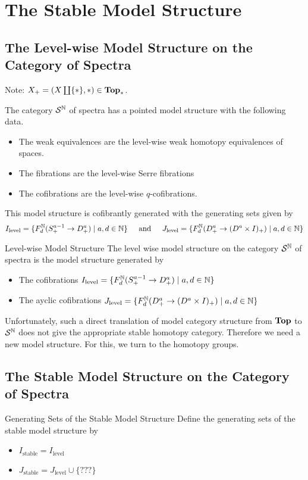 \documentclass[a4paper]{article}
\begin{document}
\pagebreak
\section{The Stable Model Structure}
\subsection{The Level-wise Model Structure on the Category of Spectra}
Note: $X_+=(X\coprod\{\ast\},\ast)\in\bold{Top}_\ast$. 

\begin{thm}{}{} The category $\mathcal{S}^{\mathbb{N}}$ of spectra has a pointed model structure with the following data. 
\begin{itemize}
\item The weak equivalences are the level-wise weak homotopy equivalences of spaces. 
\item The fibrations are the level-wise Serre fibrations
\item The cofibrations are the level-wise $q$-cofibrations. 
\end{itemize}
This model structure is cofibrantly generated with the generating sets given by $$I_\text{level}=\{F_d^{\mathbb{N}}(S_+^{a-1}\to D_+^a)\;|\;a,d\in\mathbb{N}\}\;\;\;\;\text{ and }\;\;\;\; J_\text{level}=\{F_d^{\mathbb{N}}(D_+^a\to(D^a\times I)_+)\;|\;a,d\in\mathbb{N}\}$$
\end{thm}

\begin{defn}{Level-wise Model Structure}{} The level wise model structure on the category $\mathcal{S}^{\mathbb{N}}$ of spectra is the model structure generated by 
\begin{itemize}
\item The cofibrations $I_\text{level}=\{F_d^{\mathbb{N}}(S_+^{a-1}\to D_+^a)\;|\;a,d\in\mathbb{N}\}$
\item The ayclic cofibrations $J_\text{level}=\{F_d^{\mathbb{N}}(D_+^a\to(D^a\times I)_+)\;|\;a,d\in\mathbb{N}\}$
\end{itemize}
\end{defn}

Unfortunately, such a direct translation of model category structure from $\bold{Top}$ to $\mathcal{S}^{\mathbb{N}}$ does not give the appropriate stable homotopy category. Therefore we need a new model structure. For this, we turn to the homotopy groups. 

\subsection{The Stable Model Structure on the Category of Spectra}
\begin{defn}{Generating Sets of the Stable Model Structure}{} Define the generating sets of the stable model structure by
\begin{itemize}
\item $I_\text{stable}=I_\text{level}$
\item $J_\text{stable}=J_\text{level}\cup\{???\}$
\end{itemize}
\end{defn}
\end{document}
